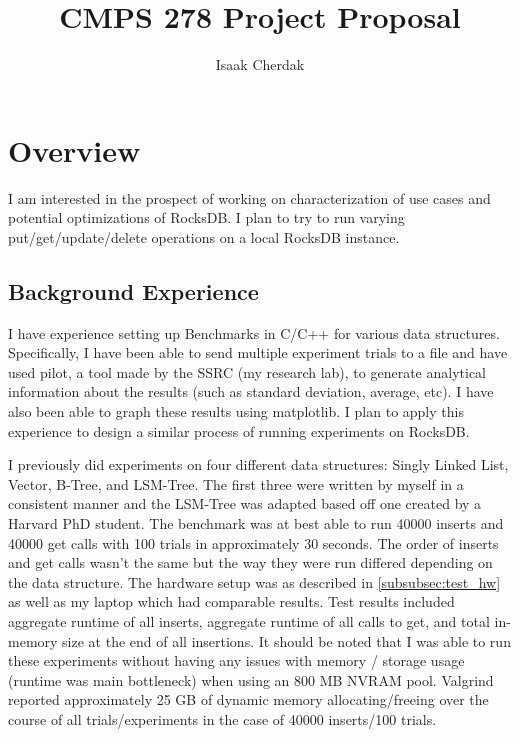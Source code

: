 \documentclass{article}
\title{CMPS 278 Project Proposal}
\author{Isaak Cherdak}
\begin{document}
\maketitle

\pagebreak

\section{Overview}
\label{sec:overview}

I am interested in the prospect of working on characterization of use cases and
potential optimizations of RocksDB. I plan to try to run varying
put/get/update/delete operations on a local RocksDB instance.

\subsection{Background Experience}
\label{subsec:background}

I have experience setting up Benchmarks in C/C++ for various data structures.
Specifically, I have been able to send multiple experiment trials to a file and
have used pilot, a tool made by the SSRC (my research lab), to generate
analytical information about the results (such as standard deviation, average,
etc). I have also been able to graph these results using matplotlib. I plan to
apply this experience to design a similar process of running experiments on
RocksDB.

I previously did experiments on four different data structures: Singly Linked
List, Vector, B-Tree, and LSM-Tree. The first three were written by myself in a
consistent manner and the LSM-Tree was adapted based off one created by a
Harvard PhD student. The benchmark was at best able to run 40000 inserts and
40000 get calls with 100 trials in approximately 30 seconds. The order of
inserts and get calls wasn't the same but the way they were run differed
depending on the data structure. The hardware setup was as described in
\ref{subsubsec:test_hw} as well as my laptop which had comparable results. Test
results included aggregate runtime of all inserts, aggregate runtime of all
calls to get, and total in-memory size at the end of all insertions. It should
be noted that I was able to run these experiments without having any issues with
memory / storage usage (runtime was main bottleneck) when using an 800 MB NVRAM
pool. Valgrind reported approximately 25 GB of dynamic memory allocating/freeing
over the course of all trials/experiments in the case of 40000 inserts/100
trials.
\end{document}
